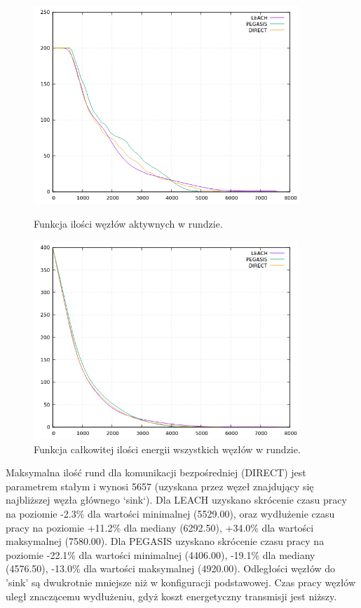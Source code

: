 \documentclass[a4paper,12pt,twoside,openany]{report}
\begin{document}
\begin{figure}[H]
 \centering
 \includegraphics[width=10cm]{images/gnuplot/test_3/nodes_in_round_xy100.png}
 \caption{Funkcja ilości węzłów aktywnych w rundzie.}
 \includegraphics[width=10cm]{images/gnuplot/test_3/energy_in_round_xy100.png}
 \caption{Funkcja całkowitej ilości energii wszystkich węzłów w rundzie.}
\end{figure}

\par
Maksymalna ilość rund dla komunikacji bezpośredniej (DIRECT) jest parametrem stałym i wynosi 5657 (uzyskana przez węzeł znajdujący się najbliższej węzła głównego `sink`).
Dla LEACH uzyskano skrócenie czasu pracy na poziomie -2.3\% dla wartości minimalnej (5529.00), oraz wydłużenie czasu pracy na poziomie +11.2\% dla mediany (6292.50), +34.0\% dla wartości maksymalnej (7580.00).
Dla PEGASIS uzyskano skrócenie czasu pracy na poziomie -22.1\% dla wartości minimalnej (4406.00), -19.1\% dla mediany (4576.50), -13.0\% dla wartości maksymalnej (4920.00).
Odległości węzłów do 'sink' są dwukrotnie mniejsze niż w konfiguracji podstawowej. Czas pracy węzłów uległ znaczącemu wydłużeniu, gdyż koszt energetyczny transmisji jest niższy.
\end{document}
